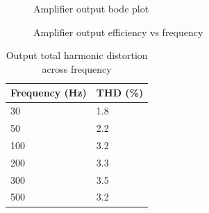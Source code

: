 \documentclass[a4paper,11pt]{article}
\begin{document}
\begin{figure}[h!]
    \centering
    \caption{Amplifier output bode plot}
\end{figure}


\begin{figure}[h!]
    \centering
    \caption{Amplifier output efficiency vs frequency}
\end{figure}


\begin{table}[h!]
    \centering
    \begin{tabular}{l|l}
    \rowcolor[HTML]{E0E0E0} 
    \textbf{Frequency (Hz)} & \textbf{THD (\%)} \\ \hline
    30                 & 1.8               \\
    50                 & 2.2               \\
    100                & 3.2               \\
    200                & 3.3               \\
    300                & 3.5               \\
    500                & 3.2              
    \end{tabular}
    \caption{Output total harmonic distortion across frequency}
    \label{T:THD}
\end{table}
\end{document}

